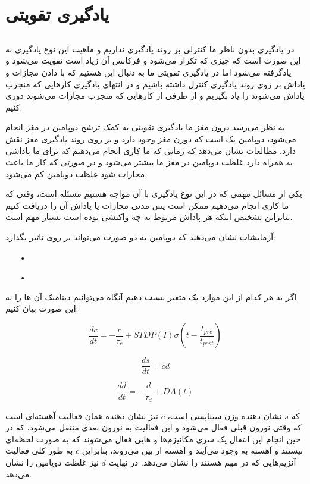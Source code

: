 \documentclass[12pt]{article}
\begin{document}
\section{یادگیری تقویتی }

\subsection{}
در یادگیری بدون ناظر  ما کنترلی بر روند یادگیری نداریم و ماهیت این نوع یادگیری به این صورت است که چیزی که تکرار می‌‌شود و فرکانس آن زیاد است تقویت می‌شود و یادگرفته می‌شود اما در یادگیری تقویتی ما به دنبال این هستیم که با دادن مجازات و پاداش بر روی روند یادگیری کنترل داشته باشیم و در انتهای یادگیری کارهایی که منجرب پاداش می‌شوند را یاد بگیریم و از طرفی از کارهایی که منجرب مجازات می‌شوند دوری کنیم.

به نظر می‌رسد درون مغز ما یادگیری تقویتی به کمک ترشح دوپامین  در مغز انجام می‌شود، دوپامین یک  است که دورن مغز وجود دارد و بر روی روند یادگیری مغز نقش دارد. مطالعات نشان می‌دهد که زمانی که ما کاری انجام می‌دهیم که برای ما پاداشی به همراه دارد غلظت دوپامین در مغز ما بیشتر می‌شود و در صورتی که کار ما باعث مجازات شود غلظت دوپامین کم می‌شود. 


یکی از مسائل مهمی که در این نوع یادگیری با آن مواجه هستیم مسئله  است، وقتی که ما کاری انجام می‌دهیم ممکن است پس مدتی مجازات یا پاداش آن را دریافت کنیم بنابراین تشخیص اینکه هر پاداش مربوط به چه واکنشی بوده است بسیار مهم است.

آزمایشات نشان می‌دهند که دوپامین به دو صورت می‌تواند بر روی  تاثیر بگذارد:

\begin{itemize}

\item[•] 
\item[•] 

\end{itemize}

اگر به هر کدام از این موارد یک متغیر نسبت دهیم آنگاه می‌توانیم دینامیک آن ها را به این صورت بیان کنیم:


$$ \frac{dc}{dt} = -\frac{c}{\tau_c} + STDP(I) \sigma(t - \frac{t_{pre}}{t_{post}}) $$

$$ \frac{ds}{dt} = c d $$

$$ \frac{dd}{dt} = -\frac{d}{\tau_d} + DA(t) $$


که $s$ نشان دهنده وزن سیناپسی است، $c$ نیز نشان دهنده همان فعالیت آهسته‌ای است که وقتی نورون قبلی فعال می‌شود و این فعالیت به نورون بعدی منتقل می‌شود، که در حین انجام این انتقال یک سری مکانیزم‌ها و  هایی فعال می‌شوند که به صورت لحظه‌ای نیستند و آهسته به وجود می‌آیند و آهسته از بین می‌روند، بنابراین $c$ به طور کلی فعالیت آنزیم‌هایی که در  مهم هستند را نشان می‌دهد. در نهایت $d$ نیز غلظت دوپامین را  نشان می‌دهد.
\end{document}
